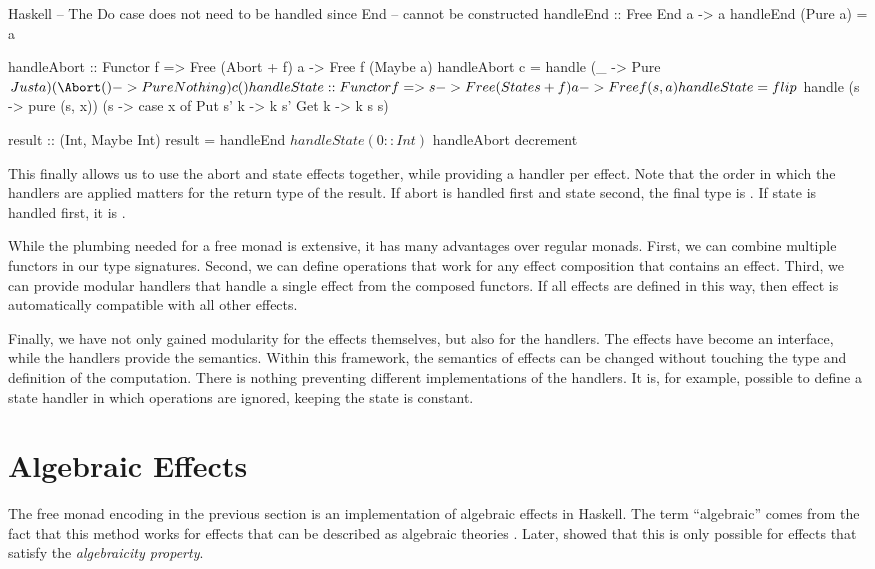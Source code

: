 \begin{lst}{Haskell}
-- The Do case does not need to be handled since End
-- cannot be constructed
handleEnd :: Free End a -> a
handleEnd (Pure a) = a

handleAbort :: Functor f => Free (Abort + f) a -> Free f (Maybe a)
handleAbort c = handle
  (\a _ -> Pure $ Just a)
  (\Abort () -> Pure Nothing) 
  c ()
  
handleState :: Functor f => s -> Free (State s + f) a -> Free f (s, a)
handleState = flip $ handle
  (\x s -> pure (s, x))
  (\x s -> case x of
      Put s' k -> k s'
      Get k -> k s s)

result :: (Int, Maybe Int)
result = handleEnd $ handleState (0::Int) $ handleAbort decrement  
\end{lst}
%
This finally allows us to use the abort and state effects together, while providing a handler per effect. Note that the order in which the handlers are applied matters for the return type of the result. If abort is handled first and state second, the final type is . If state is handled first, it is .

While the plumbing needed for a free monad is extensive, it has many advantages over regular monads. First, we can combine multiple functors in our type signatures. Second, we can define operations that work for any effect composition that contains an effect. Third, we can provide modular handlers that handle a single effect from the composed functors. If all effects are defined in this way, then effect is automatically compatible with all other effects.

Finally, we have not only gained modularity for the effects themselves, but also for the handlers. The effects have become an interface, while the handlers provide the semantics. Within this framework, the semantics of effects can be changed without touching the type and definition of the computation. There is nothing preventing different implementations of the handlers. It is, for example, possible to define a state handler in which  operations are ignored, keeping the state is constant.

\section{Algebraic Effects}

The free monad encoding in the previous section is an implementation of algebraic effects in Haskell. The term ``algebraic'' comes from the fact that this method works for effects that can be described as algebraic theories \autocite{goos_adequacy_2001}. Later, \textcite{plotkin_algebraic_2003} showed that this is only possible for effects that satisfy the \emph{algebraicity property}.

